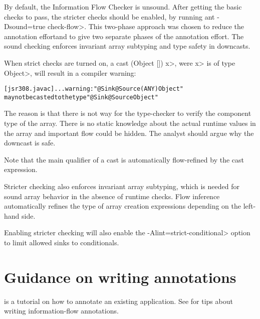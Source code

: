 By default, the Information Flow Checker is unsound.  After getting the basic checks to pass, the
 stricter checks should be enabled, by running \<ant -Dsound=true check-flow>.
This two-phase approach was chosen to reduce
the annotation effortand to give two separate phases of
the annotation effort.
 The sound checking enforces invariant 
array subtyping and type safety in downcasts.


When strict checks are turned on,
a cast \<(Object []) x>, were \<x> is of type \<Object>, will result
in a compiler warning:

\begin{alltt}
[jsr308.javac] ... warning: "@Sink @Source({ANY}) Object"
       may not be casted to the type "@Sink @Source Object"
\end{alltt}

The reason is that there is not way for the type-checker to verify
 the component type of the array. There is no static knowledge about the actual
runtime values in the array and important flow could be hidden.
The analyst should argue why the downcast is safe.

Note that the main qualifier of a cast is automatically flow-refined
by the cast expression.


\medskip

Stricter checking also enforces invariant array subtyping, which is
needed for sound array behavior in the absence of runtime checks.
Flow inference automatically refines the type of array creation
expressions depending on the left-hand side.

\medskip

Enabling stricter checking will also enable the \<-Alint=strict-conditional> option to limit 
allowed sinks to conditionals.

\section{Guidance on writing annotations}
 is a tutorial on how to annotate an existing application. 
See  for tips about
writing information-flow annotations. 



